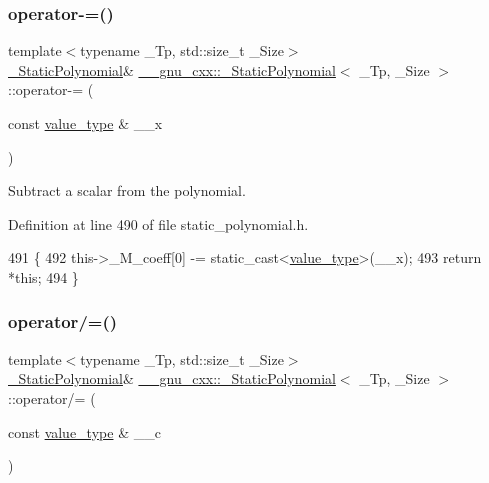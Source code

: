 \subsubsection{\texorpdfstring{operator-\/=()}{operator-=()}}
{\footnotesize\ttfamily template$<$typename \+\_\+\+Tp, std\+::size\+\_\+t \+\_\+\+Size$>$ \\
\hyperlink{class____gnu__cxx_1_1__StaticPolynomial}{\+\_\+\+Static\+Polynomial}\& \hyperlink{class____gnu__cxx_1_1__StaticPolynomial}{\+\_\+\+\_\+gnu\+\_\+cxx\+::\+\_\+\+Static\+Polynomial}$<$ \+\_\+\+Tp, \+\_\+\+Size $>$\+::operator-\/= (\begin{DoxyParamCaption}\item[{const \hyperlink{class____gnu__cxx_1_1__StaticPolynomial_aad5f3d6d5876b6926b30724aeac649d6}{value\+\_\+type} \&}]{\+\_\+\+\_\+x }\end{DoxyParamCaption})\hspace{0.3cm}{\ttfamily [inline]}}

Subtract a scalar from the polynomial. 

Definition at line 490 of file static\+\_\+polynomial.\+h.


\begin{DoxyCode}
491       \{
492         this->\_M\_coeff[0] -= \textcolor{keyword}{static\_cast<}\hyperlink{class____gnu__cxx_1_1__StaticPolynomial_aad5f3d6d5876b6926b30724aeac649d6}{value\_type}\textcolor{keyword}{>}(\_\_x);
493         \textcolor{keywordflow}{return} *\textcolor{keyword}{this};
494       \}
\end{DoxyCode}
\mbox{\label{class____gnu__cxx_1_1__StaticPolynomial_a33ab57b78b20dc2c752241c08109c360}} 
\subsubsection{\texorpdfstring{operator/=()}{operator/=()}}
{\footnotesize\ttfamily template$<$typename \+\_\+\+Tp, std\+::size\+\_\+t \+\_\+\+Size$>$ \\
\hyperlink{class____gnu__cxx_1_1__StaticPolynomial}{\+\_\+\+Static\+Polynomial}\& \hyperlink{class____gnu__cxx_1_1__StaticPolynomial}{\+\_\+\+\_\+gnu\+\_\+cxx\+::\+\_\+\+Static\+Polynomial}$<$ \+\_\+\+Tp, \+\_\+\+Size $>$\+::operator/= (\begin{DoxyParamCaption}\item[{const \hyperlink{class____gnu__cxx_1_1__StaticPolynomial_aad5f3d6d5876b6926b30724aeac649d6}{value\+\_\+type} \&}]{\+\_\+\+\_\+c }\end{DoxyParamCaption})\hspace{0.3cm}{\ttfamily [inline]}}

